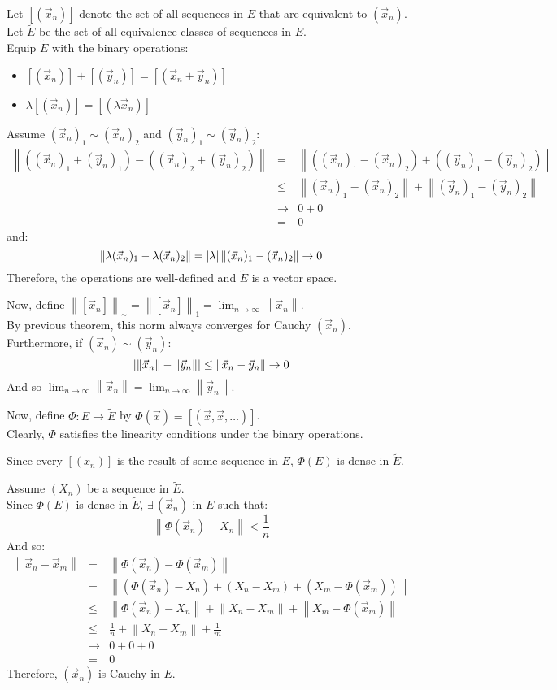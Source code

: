 \documentclass[letterpaper,12pt,fleqn]{article}
\newcommand{\Et}{\tilde{E}}
\renewcommand{\o}{\Phi}
\newcommand{\vx}{\vec{x}}
\newcommand{\vy}{\vec{y}}
\renewcommand{\l}{\lambda}
\newcommand{\norm}[1]{\left\|#1\right\|}
\begin{document}
\begin{theproof}
  Let $[(\vx_n)]$ denote the set of all sequences in $E$ that are equivalent
  to $(\vx_n)$. \\
  Let $\Et$ be the set of all equivalence classes of sequences in $E$. \\
  Equip $\Et$ with the binary operations:
  \begin{itemize}
  \item $[(\vx_n)]+[(\vy_n)]=[(\vx_n+\vy_n)]$
  \item $\l[(\vx_n)]=[(\l\vx_n)]$
  \end{itemize}

  Assume $(\vx_n)_1\sim(\vx_n)_2$ and $(\vy_n)_1\sim(\vy_n)_2$:
  \begin{eqnarray*}
    \norm{((\vx_n)_1+(\vy_n)_1)-((\vx_n)_2+(\vy_n)_2)} &=&
    \norm{((\vx_n)_1-(\vx_n)_2)+((\vy_n)_1-(\vy_n)_2)} \\
    &\le& \norm{(\vx_n)_1-(\vx_n)_2}+\norm{(\vy_n)_1-(\vy_n)_2} \\
    &\to& 0+0 \\
    &=& 0
  \end{eqnarray*}
  and:
  \[\norm{\l(\vx_n)_1-\l(\vx_n)_2}=\abs{\l}\norm{(\vx_n)_1-(\vx_n)_2}\to0\]
  Therefore, the operations are well-defined and $\Et$ is a vector space.

  Now, define $\norm{[\vx_n]}_{\sim}=\norm{[\vx_n]}_1=
  \lim_{n\to\infty}\norm{\vx_n}$. \\
  By previous theorem, this norm always converges for Cauchy $(\vx_n)$. \\
  Furthermore, if $(\vx_n)\sim(\vy_n)$:
  \[\abs{\norm{\vx_n}-\norm{\vy_n}}\le\norm{\vx_n-\vy_n}\to0\]
  And so $\lim_{n\to\infty}\norm{\vx_n}=\lim_{n\to\infty}\norm{\vy_n}$.

  Now, define $\o:E\to\Et$ by $\o(\vx)=[(\vx,\vx,\ldots)]$. \\
  Clearly, $\o$ satisfies the linearity conditions under the binary operations.

  Since every $[(x_n)]$ is the result of some sequence in $E$, $\o(E)$ is
  dense in $\Et$.

  Assume $(X_n)$ be a sequence in $\Et$. \\
  Since $\o(E)$ is dense in $\Et$, $\exists\,(\vx_n)$ in $E$ such that:
  \[\norm{\o(\vx_n)-X_n}<\frac{1}{n}\]
  And so:
  \begin{eqnarray*}
    \norm{\vx_n-\vx_m} &=& \norm{\o(\vx_n)-\o(\vx_m)} \\
    &=& \norm{(\o(\vx_n)-X_n)+(X_n-X_m)+(X_m-\o(\vx_m))} \\
    &\le& \norm{\o(\vx_n)-X_n}+\norm{X_n-X_m}+\norm{X_m-\o(\vx_m)} \\
    &\le& \frac{1}{n}+\norm{X_n-X_m}+\frac{1}{m} \\
    &\to& 0+0+0 \\
    &=& 0
  \end{eqnarray*}
  Therefore, $(\vx_n)$ is Cauchy in $E$.


\end{theproof}
\end{document}
